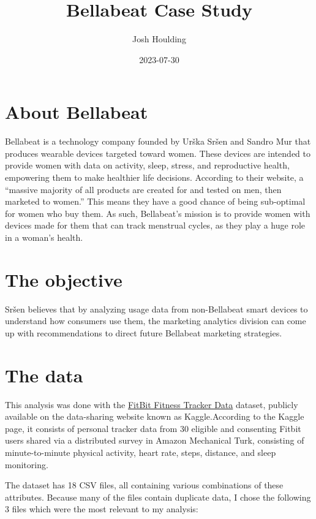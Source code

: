 \documentclass[
]{article}
\title{Bellabeat Case Study}
\author{Josh Houlding}
\date{2023-07-30}
\begin{document}
\maketitle

\hypertarget{about-bellabeat}{%
\section{About Bellabeat}\label{about-bellabeat}}

Bellabeat is a technology company founded by Urška Sršen and Sandro Mur
that produces wearable devices targeted toward women. These devices are
intended to provide women with data on activity, sleep, stress, and
reproductive health, empowering them to make healthier life decisions.
According to their website, a ``massive majority of all products are
created for and tested on men, then marketed to women.'' This means they
have a good chance of being sub-optimal for women who buy them. As such,
Bellabeat's mission is to provide women with devices made for them that
can track menstrual cycles, as they play a huge role in a woman's
health.

\hypertarget{the-objective}{%
\section{The objective}\label{the-objective}}

Sršen believes that by analyzing usage data from non-Bellabeat smart
devices to understand how consumers use them, the marketing analytics
division can come up with recommendations to direct future Bellabeat
marketing strategies.

\hypertarget{the-data}{%
\section{The data}\label{the-data}}

This analysis was done with the
\href{https://www.kaggle.com/datasets/arashnic/fitbit}{FitBit Fitness
Tracker Data} dataset, publicly available on the data-sharing website
known as Kaggle.According to the Kaggle page, it consists of personal
tracker data from 30 eligible and consenting Fitbit users shared via a
distributed survey in Amazon Mechanical Turk, consisting of
minute-to-minute physical activity, heart rate, steps, distance, and
sleep monitoring.

The dataset has 18 CSV files, all containing various combinations of
these attributes. Because many of the files contain duplicate data, I
chose the following 3 files which were the most relevant to my analysis:
\end{document}
